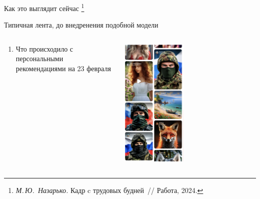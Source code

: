 \documentclass[12pt,pdf,hyperref={unicode}]{beamer}
\begin{document}
\begin{frame}{Как это выглядит сейчас%
\footnote{\textit{М.\,Ю.~Назарько.}  Кадр c трудовых будней~// Работа, 2024.}}

  Типичная лента, до внедренения подобной модели
  \begin{columns}
    \begin{column}{0.3\textwidth}
      \begin{enumerate}[1)]
        \item Что происходило с персональными рекомендациями на 23 февраля 
      \end{enumerate}
    \end{column}
    \begin{column}{0.7\textwidth}
      \tiny 
     \includegraphics[width=0.45\textwidth]{image.png}      
    \end{column}
  \end{columns}
  \bigskip
\end{frame}
\end{document}
